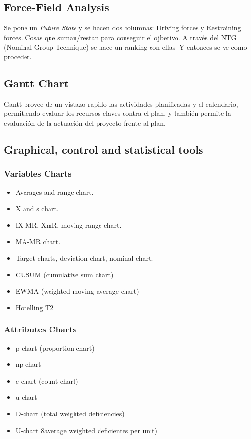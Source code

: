 \documentclass[]{article}
\begin{document}
\subsection{Force-Field Analysis}

Se pone un \textit{Future State} y se hacen dos columnas: Driving forces y Restraining forces. Cosas que suman/restan para conseguir el ojbetivo. A través del NTG (Nominal Group Technique) se hace un ranking con ellas. Y entonces se ve como proceder.

\subsection{Gantt Chart}

Gantt provee de un vistazo rapido las actividades planificadas y el calendario, permitiendo evaluar los recursos claves contra el plan, y también permite la evaluación de la actuación del proyecto frente al plan.

\subsection{Graphical, control and statistical tools}

\subsubsection{Variables Charts}

\begin{itemize}
	\item Averages and range chart.
	\item X and s chart.
	\item IX-MR, XmR, moving range chart.
	\item MA-MR chart.
	\item Target charts, deviation chart, nominal chart.
	\item CUSUM (cumulative sum chart)
	\item EWMA (weighted moving average chart)
	\item Hotelling T2
\end{itemize}

\subsubsection{Attributes Charts}

\begin{itemize}
	\item p-chart (proportion chart)
	\item np-chart
	\item c-chart (count chart)
	\item u-chart
	\item D-chart (total weighted deficiencies)
	\item U-chart 8average weighted deficientes per unit)
\end{itemize}
\end{document}
